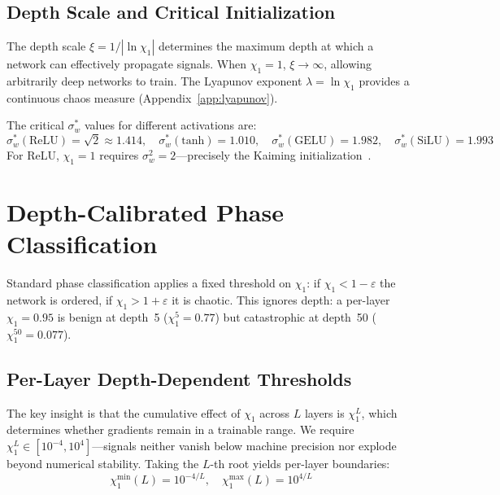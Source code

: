 \documentclass[10pt]{article}
\begin{document}
\subsection{Depth Scale and Critical Initialization}

The depth scale $\xi = 1/|\ln \chi_1|$ determines the maximum depth at which a network can effectively propagate signals.
When $\chi_1 = 1$, $\xi \to \infty$, allowing arbitrarily deep networks to train.
The Lyapunov exponent $\lambda = \ln\chi_1$ provides a continuous chaos measure (Appendix~\ref{app:lyapunov}).

The critical $\sigma_w^*$ values for different activations are:
\begin{equation}
    \sigma_w^*(\text{ReLU}) = \sqrt{2} \approx 1.414, \quad
    \sigma_w^*(\text{tanh}) = 1.010, \quad
    \sigma_w^*(\text{GELU}) = 1.982, \quad
    \sigma_w^*(\text{SiLU}) = 1.993
    \label{eq:eoc-values}
\end{equation}
For ReLU, $\chi_1 = 1$ requires $\sigma_w^2 = 2$---precisely the Kaiming initialization~\cite{he2015delving}.

\section{Depth-Calibrated Phase Classification}
\label{sec:calibrated}

Standard phase classification applies a fixed threshold on $\chi_1$: if $\chi_1 < 1 - \varepsilon$ the network is ordered, if $\chi_1 > 1 + \varepsilon$ it is chaotic.
This ignores depth: a per-layer $\chi_1 = 0.95$ is benign at depth~5 ($\chi_1^5 = 0.77$) but catastrophic at depth~50 ($\chi_1^{50} = 0.077$).

\subsection{Per-Layer Depth-Dependent Thresholds}

The key insight is that the cumulative effect of $\chi_1$ across $L$ layers is $\chi_1^L$, which determines whether gradients remain in a trainable range.
We require $\chi_1^L \in [10^{-4}, 10^4]$---signals neither vanish below machine precision nor explode beyond numerical stability.
Taking the $L$-th root yields per-layer boundaries:
\begin{equation}
    \chi_1^{\min}(L) = 10^{-4/L}, \quad \chi_1^{\max}(L) = 10^{4/L}
    \label{eq:depth-thresholds}
\end{equation}
\end{document}
